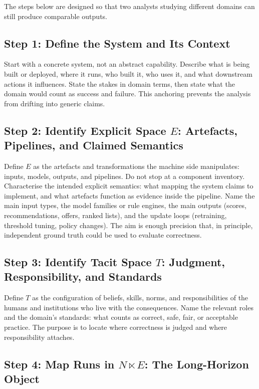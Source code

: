 The steps below are designed so that two analysts studying different domains can still produce comparable outputs.

\subsection{Step 1: Define the System and Its Context}

Start with a concrete system, not an abstract capability. Describe what is being built or deployed, where it runs, who built it, who uses it, and what downstream actions it influences. State the stakes in domain terms, then state what the domain would count as success and failure. This anchoring prevents the analysis from drifting into generic claims.

\subsection{Step 2: Identify Explicit Space \(E\): Artefacts, Pipelines, and Claimed Semantics}

Define \(E\) as the artefacts and transformations the machine side manipulates: inputs, models, outputs, and pipelines. Do not stop at a component inventory. Characterise the intended explicit semantics: what mapping the system claims to implement, and what artefacts function as evidence inside the pipeline. Name the main input types, the model families or rule engines, the main outputs (scores, recommendations, offers, ranked lists), and the update loops (retraining, threshold tuning, policy changes). The aim is enough precision that, in principle, independent ground truth could be used to evaluate correctness.

\subsection{Step 3: Identify Tacit Space \(T\): Judgment, Responsibility, and Standards}

Define \(T\) as the configuration of beliefs, skills, norms, and responsibilities of the humans and institutions who live with the consequences. Name the relevant roles and the domain’s standards: what counts as correct, safe, fair, or acceptable practice. The purpose is to locate where correctness is judged and where responsibility attaches.

\subsection{Step 4: Map Runs in \(N \ltimes E\): The Long-Horizon Object}


